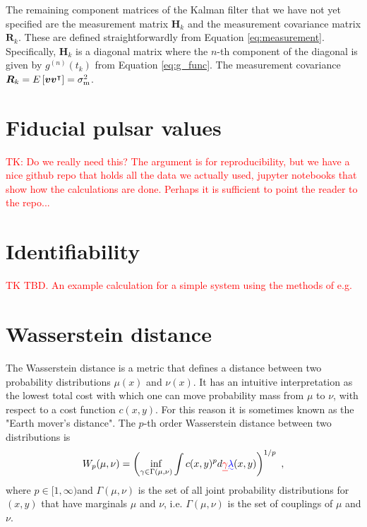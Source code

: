 \documentclass[fleqn,usenatbib,useAMS]{mnras}
\providecommand{\DIFadd}[1]{{\protect\color{blue}\uwave{#1}}} %
\providecommand{\DIFdel}[1]{{\protect\color{red}\sout{#1}}}                      %
\providecommand{\DIFaddbegin}{} %
\providecommand{\DIFaddend}{} %
\providecommand{\DIFdelbegin}{} %
\providecommand{\DIFdelend}{} %
\newcommand{\DIFscaledelfig}{0.5}
\newlength{\DIFdelgraphicswidth} %
\newlength{\DIFdelgraphicsheight} %
\newcommand{\DIFaddincludegraphics}[2][]{{\color{blue}\fbox{\DIFOincludegraphics[#1]{#2}}}} %
\newcommand{\DIFdelincludegraphics}[2][]{%
\sbox{\DIFdelgraphicsbox}{\DIFOincludegraphics[#1]{#2}}%
\settoboxwidth{\DIFdelgraphicswidth}{\DIFdelgraphicsbox} %
\settoboxtotalheight{\DIFdelgraphicsheight}{\DIFdelgraphicsbox} %
\scalebox{\DIFscaledelfig}{%
\parbox[b]{\DIFdelgraphicswidth}{\usebox{\DIFdelgraphicsbox}\\[-\baselineskip] \rule{\DIFdelgraphicswidth}{0em}}\llap{\resizebox{\DIFdelgraphicswidth}{\DIFdelgraphicsheight}{%
\setlength{\unitlength}{\DIFdelgraphicswidth}%
\begin{picture}(1,1)%
\thicklines\linethickness{2pt} %
{\color[rgb]{1,0,0}\put(0,0){\framebox(1,1){}}}%
{\color[rgb]{1,0,0}\put(0,0){\line( 1,1){1}}}%
{\color[rgb]{1,0,0}\put(0,1){\line(1,-1){1}}}%
\end{picture}%
}\hspace*{3pt}}} %
} %
\DeclareRobustCommand{\DIFaddbegin}{\DIFOaddbegin \let\includegraphics\DIFaddincludegraphics} %
\DeclareRobustCommand{\DIFaddend}{\DIFOaddend \let\includegraphics\DIFOincludegraphics} %
\DeclareRobustCommand{\DIFdelbegin}{\DIFOdelbegin \let\includegraphics\DIFdelincludegraphics} %
\DeclareRobustCommand{\DIFdelend}{\DIFOaddend \let\includegraphics\DIFOincludegraphics} %
\begin{document}
The remaining component matrices of the Kalman filter that we have not yet specified are the measurement matrix $\boldsymbol{H}_k$ and the measurement covariance matrix $\boldsymbol{R}_k$. These are defined straightforwardly from Equation \eqref{eq:measurement}. Specifically, 
$\boldsymbol{H}_k$ is a diagonal matrix where the $n$-th component of the diagonal is given by $g^{(n)}(t_k)$ from Equation \eqref{eq:g_func}. The measurement covariance $\boldsymbol{R}_k = E \left[ \boldsymbol{v} \boldsymbol{v}^\intercal \right] = \sigma^2_{\rm m}$.



\section{Fiducial pulsar values}\label{appendix_fiducial}
\textcolor{red}{TK: Do we really need this? The argument is for reproducibility, but we have a nice github repo that holds all the data we actually used, jupyter notebooks that show how the calculations are done. Perhaps it is sufficient to point the reader to the repo... } 
\section{Identifiability}\label{appendix_identifiability}
\textcolor{red}{TK TBD. An example calculation for a simple system using the methods of e.g. } \citep{KARLSSON2012941} \citep{SEDOGLAVIC2002735}



\section{Wasserstein distance}\label{sec:wasserstein}
The Wasserstein distance is a metric that defines a distance between two probability distributions $\mu(x)$ and $\nu(x)$. It has an intuitive interpretation as the lowest total cost with which one can move probability mass from $\mu$ to $\nu$, with respect to a cost function $c(x,y)$. For this reason it is sometimes known as the "Earth mover's distance". The $p$-th order Wasserstein distance between two distributions is
\begin{eqnarray}
	W_p(\mu,\nu)= \left( \inf_{\gamma \in \Gamma(\mu, \nu)}  \int c(x,y)^p d \DIFdelbegin \DIFdel{\gamma }\DIFdelend \DIFaddbegin \DIFadd{\lambda }\DIFaddend (x,y)\right)^{1/p} \label{eq:wasserstein} \ ,
\end{eqnarray}
where $p \in [1,\infty)$\DIFaddbegin \DIFadd{, $\lambda(x,y)$ is the transport plan, }\DIFaddend and $\Gamma(\mu, \nu)$ is the set of all joint probability distributions for $(x,y)$ that have marginals $\mu$ and $\nu$, i.e. $\Gamma(\mu, \nu)$ is the set of couplings of $\mu$ and $\nu$. 
\DIFdelbegin %
\DIFdelend 
\end{document}
